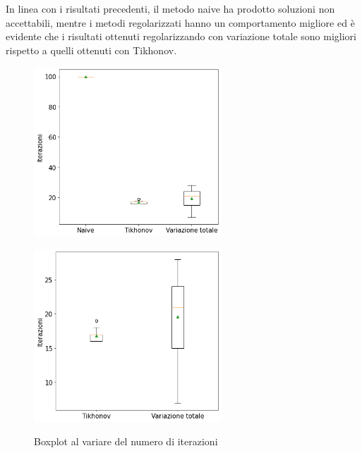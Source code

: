 \documentclass[11pt]{article}
\begin{document}
In linea con i risultati precedenti, il metodo naive ha prodotto soluzioni non accettabili, 
mentre i metodi regolarizzati hanno un comportamento migliore ed è evidente che i risultati ottenuti regolarizzando con variazione totale sono migliori rispetto a quelli ottenuti con Tikhonov.\\

\begin{figure}[H]
    \centering
    \begin{minipage}{0.45\textwidth}
        \centering
        \includegraphics[width=7cm]{esecuzioni_multiple/100/iter1.png}
        \label{fig:100_iter1}
    \end{minipage}\hfill
    \begin{minipage}{0.45\textwidth}
        \centering
        \includegraphics[width=7cm]{esecuzioni_multiple/100/iter2.png}
        \label{fig:100_iter2}
    \end{minipage}
    \caption{Boxplot al variare del numero di iterazioni}
\end{figure}
\end{document}
